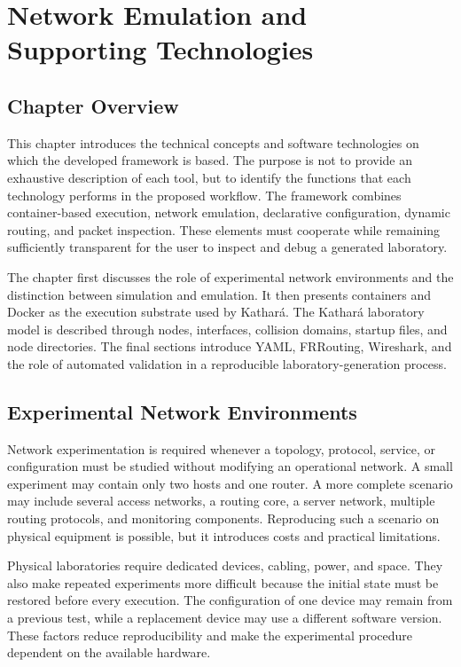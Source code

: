 \chapter{Network Emulation and Supporting Technologies}
\label{chap:background}

\section{Chapter Overview}
\label{sec:chapter1-overview}

This chapter introduces the technical concepts and software technologies on
which the developed framework is based. The purpose is not to provide an
exhaustive description of each tool, but to identify the functions that each
technology performs in the proposed workflow. The framework combines
container-based execution, network emulation, declarative configuration,
dynamic routing, and packet inspection. These elements must cooperate while
remaining sufficiently transparent for the user to inspect and debug a
generated laboratory.

The chapter first discusses the role of experimental network environments and
the distinction between simulation and emulation. It then presents containers
and Docker as the execution substrate used by Kathar\'a. The Kathar\'a
laboratory model is described through nodes, interfaces, collision domains,
startup files, and node directories. The final sections introduce YAML,
FRRouting, Wireshark, and the role of automated validation in a reproducible
laboratory-generation process.

\section{Experimental Network Environments}
\label{sec:experimental-network-environments}

Network experimentation is required whenever a topology, protocol, service,
or configuration must be studied without modifying an operational network. A
small experiment may contain only two hosts and one router. A more complete
scenario may include several access networks, a routing core, a server
network, multiple routing protocols, and monitoring components. Reproducing
such a scenario on physical equipment is possible, but it introduces costs
and practical limitations.

Physical laboratories require dedicated devices, cabling, power, and space.
They also make repeated experiments more difficult because the initial state
must be restored before every execution. The configuration of one device may
remain from a previous test, while a replacement device may use a different
software version. These factors reduce reproducibility and make the
experimental procedure dependent on the available hardware.

